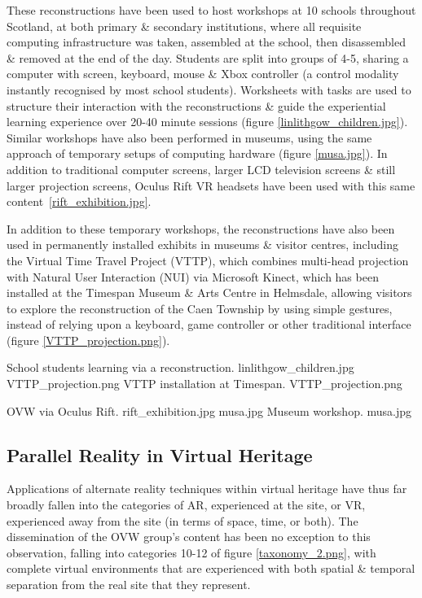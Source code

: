 These reconstructions have been used to host workshops at 10 schools throughout Scotland, at both primary \& secondary institutions, where all requisite computing infrastructure was taken, assembled at the school, then disassembled \& removed at the end of the day. Students are split into groups of 4-5, sharing a computer with screen, keyboard, mouse \& Xbox controller (a control modality instantly recognised by most school students). Worksheets with tasks are used to structure their interaction with the reconstructions \& guide the experiential learning experience over 20-40 minute sessions (figure \ref{linlithgow_children.jpg}). Similar workshops have also been performed in museums, using the same approach of temporary setups of computing hardware (figure \ref{musa.jpg}). In addition to traditional computer screens, larger LCD television screens \& still larger projection screens, Oculus Rift VR headsets have been used with this same content~\ref{rift_exhibition.jpg}.

In addition to these temporary workshops, the reconstructions have also been used in permanently installed exhibits in museums \& visitor centres, including the Virtual Time Travel Project (VTTP), which combines multi-head projection with Natural User Interaction (NUI) via Microsoft Kinect, which has been installed at the Timespan Museum \& Arts Centre in Helmsdale, allowing visitors to explore the reconstruction of the Caen Township by using simple gestures, instead of relying upon a keyboard, game controller or other traditional interface (figure \ref{VTTP_projection.png}).

 {School students learning via a reconstruction.} {linlithgow_children.jpg}
       {VTTP_projection.png} {VTTP installation at Timespan.} {VTTP_projection.png}

 {OVW via Oculus Rift.} {rift_exhibition.jpg}
       {musa.jpg} {Museum workshop.} {musa.jpg}


\subsection{Parallel Reality in Virtual Heritage}
Applications of alternate reality techniques within virtual heritage have thus far broadly fallen into the categories of AR, experienced at the site, or VR, experienced away from the site (in terms of space, time, or both). The dissemination of the OVW group's content has been no exception to this observation, falling into categories 10-12 of figure \ref{taxonomy_2.png}, with complete virtual environments that are experienced with both spatial \& temporal separation from the real site that they represent.

